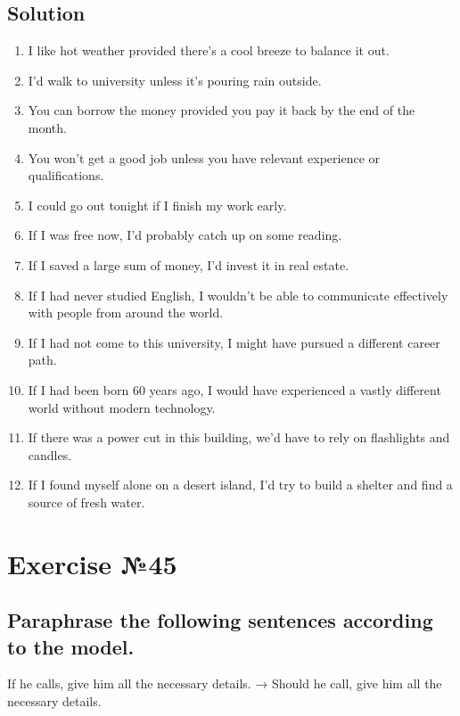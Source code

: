 \subsection*{Solution}
\begin{enumerate}
      \item I like hot weather provided there's a cool breeze to balance it out.
      \item I'd walk to university unless it's pouring rain outside.
      \item You can borrow the money provided you pay it back by the end of the month.
      \item You won't get a good job unless you have relevant experience or qualifications.
      \item I could go out tonight if I finish my work early.
      \item If I was free now, I'd probably catch up on some reading.
      \item If I saved a large sum of money, I'd invest it in real estate.
      \item If I had never studied English, I wouldn't be able to communicate effectively with people from around the world.
      \item If I had not come to this university, I might have pursued a different career path.
      \item If I had been born 60 years ago, I would have experienced a vastly different world without modern technology.
      \item If there was a power cut in this building, we'd have to rely on flashlights and candles.
      \item If I found myself alone on a desert island, I'd try to build a shelter and find a source of fresh water.
\end{enumerate}

\section{Exercise №45}
\subsection*{Paraphrase the following sentences according to the model.}
If he calls, give him all the necessary details. → Should he call, give him all the necessary details.

